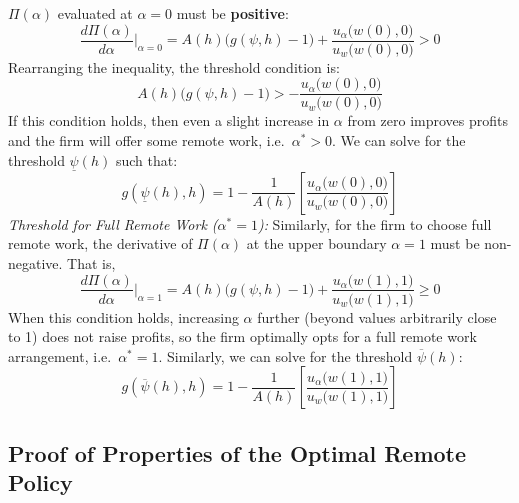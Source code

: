 \documentclass[
  11pt,
  letterpaper,
  DIV=11,
  numbers=noendperiod]{scrartcl}
\theoremstyle{plain}
\theoremstyle{remark}
\begin{document}
\(\Pi(\alpha)\) evaluated at \(\alpha=0\) must be \textbf{positive}:\[
\frac{d\Pi(\alpha)}{d\alpha}\Big|_{\alpha=0} = A(h)\big(g(\psi,h)-1\big)+\frac{u_\alpha\big(w(0),0\big)}{u_w\big(w(0),0\big)}>0\]
Rearranging the inequality, the threshold condition is:\[
A(h)\big(g(\psi,h)-1\big)>-\frac{u_\alpha\big(w(0),0\big)}{u_w\big(w(0),0\big)}\]
If this condition holds, then even a slight increase in \(\alpha\) from
zero improves profits and the firm will offer some remote work,
i.e.~\(\alpha^*>0\). We can solve for the threshold
\(\underline{\psi}(h)\) such
that:\[g(\underline{\psi}(h),h)=1-\frac{1}{A(h)}\left[\frac{u_\alpha\big(w(0),0\big)}{u_w\big(w(0),0\big)}\right]\]\emph{Threshold
for Full Remote Work (\(\alpha^*=1\)):} Similarly, for the firm to
choose full remote work, the derivative of \(\Pi(\alpha)\) at the upper
boundary \(\alpha=1\) must be non-negative. That
is,\[\frac{d\Pi(\alpha)}{d\alpha}\Big|_{\alpha=1} = A(h)\big(g(\psi,h)-1\big)+\frac{u_\alpha\big(w(1),1\big)}{u_w\big(w(1),1\big)}\geq 0
\] When this condition holds, increasing \(\alpha\) further (beyond
values arbitrarily close to 1) does not raise profits, so the firm
optimally opts for a full remote work arrangement, i.e.~\(\alpha^*=1\).
Similarly, we can solve for the threshold
\(\overline{\psi}(h)\):\[g(\overline{\psi}(h),h)=1-\frac{1}{A(h)}\left[\frac{u_\alpha\big(w(1),1\big)}{u_w\big(w(1),1\big)}\right]\]

\subsection{Proof of Properties of the Optimal Remote
Policy}\label{sec-appendix-properties-remote-policy-general}
\end{document}
